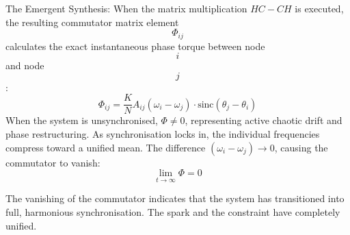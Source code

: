 The Emergent Synthesis:
When the matrix multiplication \(HC - CH\) is executed, the resulting commutator matrix element \[\Phi _{ij}\] calculates the exact instantaneous phase torque between node \[i\] and node \[j\]:
\[\Phi _{ij}=\frac{K}{N}A_{ij}(\omega _{i}-\omega _{j})\cdot \text{sinc}(\theta _{j}-\theta _{i})\]
When the system is unsynchronised, \(\Phi \neq 0\), representing active chaotic drift and phase restructuring.
As synchronisation locks in, the individual frequencies compress toward a unified mean. The difference \((\omega_i - \omega_j) \to 0\), causing the commutator to vanish:
\[\lim _{t\rightarrow \infty }\Phi =0\]


The vanishing of the commutator indicates that the system has transitioned into full, harmonious synchronisation. The spark and the constraint have completely unified.
